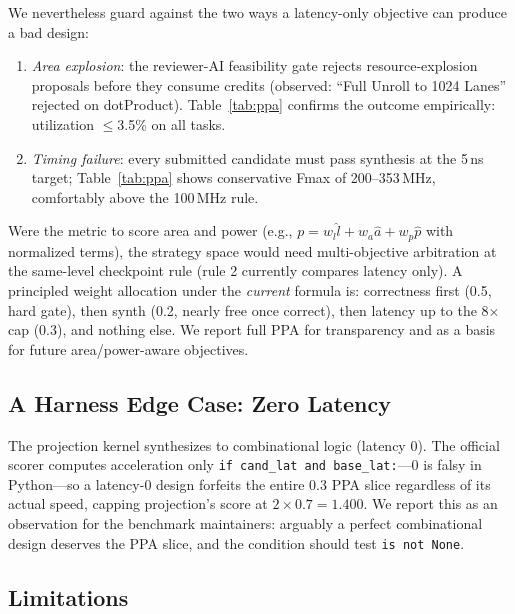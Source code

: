 \documentclass[10pt,conference,letterpaper]{IEEEtran}
\begin{document}
We nevertheless guard against the two ways a latency-only objective can produce a bad design:
\begin{enumerate}
    \item \emph{Area explosion}: the reviewer-AI feasibility gate rejects resource-explosion proposals before they consume credits (observed: ``Full Unroll to 1024 Lanes'' rejected on dotProduct). Table~\ref{tab:ppa} confirms the outcome empirically: utilization $\leq$3.5\% on all tasks.
    \item \emph{Timing failure}: every submitted candidate must pass synthesis at the 5\,ns target; Table~\ref{tab:ppa} shows conservative Fmax of 200--353\,MHz, comfortably above the 100\,MHz rule.
\end{enumerate}

Were the metric to score area and power (e.g., $p = w_l \hat{l} + w_a \hat{a} + w_p \hat{p}$ with normalized terms), the strategy space would need multi-objective arbitration at the same-level checkpoint rule (rule 2 currently compares latency only). A principled weight allocation under the \emph{current} formula is: correctness first (0.5, hard gate), then synth (0.2, nearly free once correct), then latency up to the 8$\times$ cap (0.3), and nothing else. We report full PPA for transparency and as a basis for future area/power-aware objectives.

\subsection{A Harness Edge Case: Zero Latency}
\label{sec:harness-quirk}

The projection kernel synthesizes to combinational logic (latency 0). The official scorer computes acceleration only \texttt{if cand\_lat and base\_lat:}---0 is falsy in Python---so a latency-0 design forfeits the entire 0.3 PPA slice regardless of its actual speed, capping projection's score at $2\times0.7=1.400$. We report this as an observation for the benchmark maintainers: arguably a perfect combinational design deserves the PPA slice, and the condition should test \texttt{is not None}.

\subsection{Limitations}
\label{sec:limitations}
\end{document}
